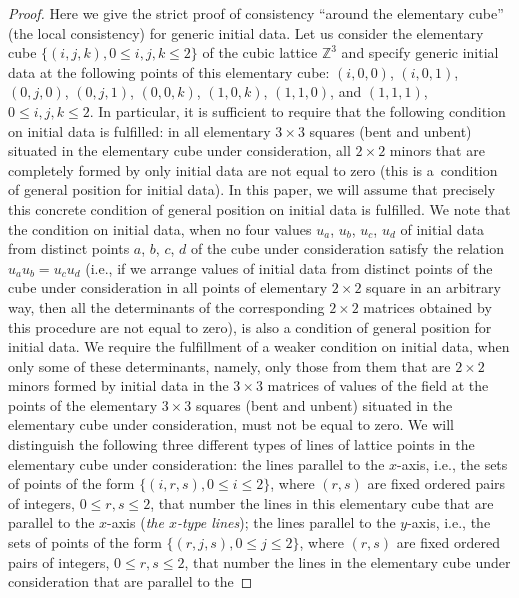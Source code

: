 \documentclass[11pt]{article}
\begin{document}
\begin{proof}
 Here we give the strict proof of consistency
``around the elementary cube'' (the local consistency) for generic initial data.
Let us consider the elementary cube $\{(i, j, k), 0
\leq i, j, k \leq 2 \}$ of the cubic lattice $\mathbb{Z}^3$ and
specify generic initial data at the following points of this
elementary cube: $(i, 0, 0)$, $(i, 0, 1)$, $(0, j, 0)$, $(0, j, 1)$,
$(0, 0, k)$, $(1, 0, k)$, $(1, 1, 0)$, and $(1, 1, 1)$, $0 \leq i,
j, k \leq 2$. In particular, it is suf\/f\/icient to require that the
following condition on initial data is fulf\/illed: in all elementary
$3 \times 3$ squares (bent and unbent) situated in the elementary
cube under consideration, all $2 \times 2$ minors that are
completely formed by only initial data are not equal to zero (this
is a~condition of general position for initial data). In this paper,
we will assume that precisely this concrete condition of general
position on initial data is fulf\/illed. We note that the condition on
initial data, when no four values $u_a$, $u_b$, $u_c$, $u_d$ of initial
data from distinct points $a$, $b$, $c$, $d$ of the cube under
consideration satisfy the relation $u_a u_b = u_c u_d$ (i.e., if we
arrange values of initial data from distinct points of the cube
under consideration in all points of elementary $2 \times 2$ square
in an arbitrary way, then all the determinants of the corresponding
$2 \times 2$ matrices obtained by this procedure are not equal to
zero), is also a condition of general position for initial data. We
require the fulf\/illment of a weaker condition on initial data, when
only some of these determinants, namely, only those from them that
are $2 \times 2$ minors formed by initial data in the $3 \times 3$
matrices of values of the f\/ield at the points of the elementary $3
\times 3$ squares (bent and unbent) situated in the elementary cube
under consideration, must not be equal to zero. We will distinguish
the following three dif\/ferent types of lines of lattice points in
the elementary cube under consideration: the lines parallel to the
$x$-axis, i.e., the sets of points of the form $\{(i, r, s), 0 \leq
i \leq 2\}$, where $(r, s)$ are f\/ixed ordered pairs of integers, $0
\leq r, s \leq 2$, that number the lines in this elementary cube
that are parallel to the $x$-axis ({\it the $x$-type lines}); the
lines parallel to the $y$-axis, i.e., the sets of points of the form
$\{(r, j, s), 0 \leq j \leq 2\}$, where $(r, s)$ are f\/ixed ordered
pairs of integers, $0 \leq r, s \leq 2$, that number the lines in
the elementary cube under consideration that are parallel to the

\end{proof}
\end{document}

